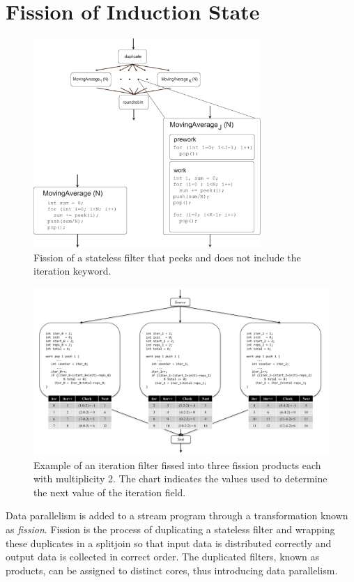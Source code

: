 \section{Fission of Induction State}
\label{sec:fission}

\begin{figure}[t!]
\centering
\includegraphics[width=3.4in]{figures/duplicate-fission.pdf}
\caption{Fission of a stateless filter that peeks and does not include the iteration keyword. \protect\label{fig:duplicate-fission-example}}
\end{figure}


\begin{figure}[t!]
\centering
\includegraphics[width=6.5in]{figures/fission-example.pdf}
\caption{Example of an iteration filter fissed into three fission products each with multiplicity 2.  The chart indicates the values used to determine the next value of the iteration field.  
\protect\label{fig:fission-example}}
\end{figure}

Data parallelism is added to a stream program through a transformation
known as {\it fission}. Fission is the process of duplicating a
stateless filter and wrapping these duplicates in a splitjoin so that
input data is distributed correctly and output data is collected in
correct order. The duplicated filters, known as products, can be
assigned to distinct cores, thus introducing data parallelism.

